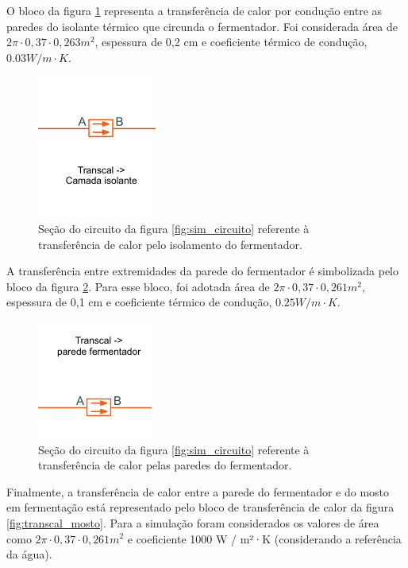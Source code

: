 O bloco da figura \ref{fig:transcal_isolante} representa a transferência de calor por condução entre as paredes do isolante térmico que circunda o fermentador. Foi considerada área de \(2\pi \cdot 0,37 \cdot 0,263 m^2\), espessura de 0,2 cm e coeficiente térmico de condução, \(0.03 W / m \cdot K\).

\begin{figure}[H]
    \centering
    \includegraphics[scale=0.8]{figuras/projeto/controle/transcal_isolante.png}
    \caption{Seção do circuito da figura \ref{fig:sim_circuito} referente à transferência de calor pelo isolamento do fermentador.}
    \label{fig:transcal_isolante}
\end{figure}


A transferência entre extremidades da parede do fermentador é simbolizada pelo bloco da figura \ref{fig:transcal_fermentador}. Para esse bloco, foi adotada área de \(2\pi \cdot 0,37 \cdot 0,261 m^2\), espessura de 0,1 cm e coeficiente térmico de condução, \(0.25 W / m \cdot K\).

\begin{figure}[H]
    \centering
    \includegraphics[scale=0.8]{figuras/projeto/controle/transcal_fermentador.png}
    \caption{Seção do circuito da figura \ref{fig:sim_circuito} referente à transferência de calor pelas paredes do fermentador.}
    \label{fig:transcal_fermentador}
\end{figure}


Finalmente, a transferência de calor entre a parede do fermentador e do mosto em fermentação está representado pelo bloco de transferência de calor da figura \ref{fig:transcal_mosto}. Para a simulação foram considerados os valores de área como \(2\pi \cdot 0,37 \cdot 0,261 m^2\) e coeficiente 1000 W / m²·K (considerando a referência da água). 

